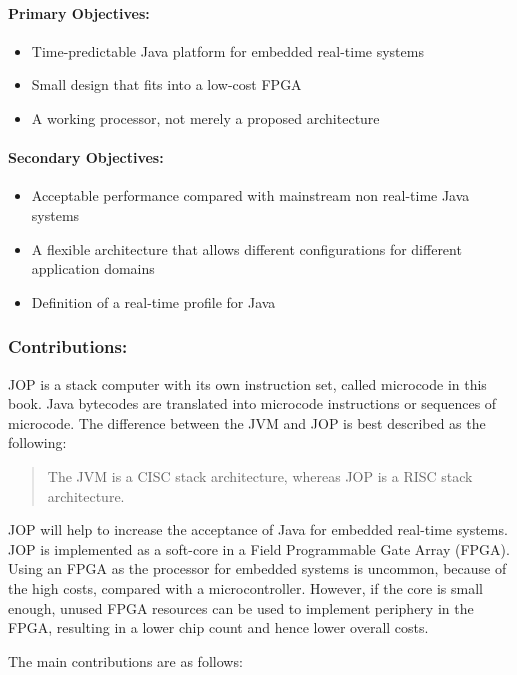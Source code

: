 \paragraph{Primary Objectives:}
    \begin{itemize}
        \item Time-predictable Java platform for embedded real-time
        systems
        \item Small design that fits into a low-cost FPGA
        \item A working processor, not merely a proposed architecture
    \end{itemize}
\paragraph{Secondary Objectives:}
    \begin{itemize}
        \item Acceptable performance compared with mainstream non
        real-time Java systems
        \item A flexible architecture that allows different
        configurations for different application domains
        \item Definition of a real-time profile for Java
    \end{itemize}

\subsubsection{Contributions:}

JOP is a stack computer with its own instruction set, called
microcode in this book. Java bytecodes are translated into microcode
instructions or sequences of microcode. The difference between the
JVM and JOP is best described as the following:
\begin{quote}
The JVM is a CISC stack architecture, whereas JOP is a RISC stack
architecture.
\end{quote}


JOP will help to increase the acceptance of Java for embedded
real-time systems. JOP is implemented as a soft-core in a Field
Programmable Gate Array (FPGA). Using an FPGA as the processor for
embedded systems is uncommon, because of the high costs, compared
with a microcontroller. However, if the core is small enough, unused
FPGA resources can be used to implement periphery in the FPGA,
resulting in a lower chip count and hence lower overall costs.

The main contributions are as follows:

